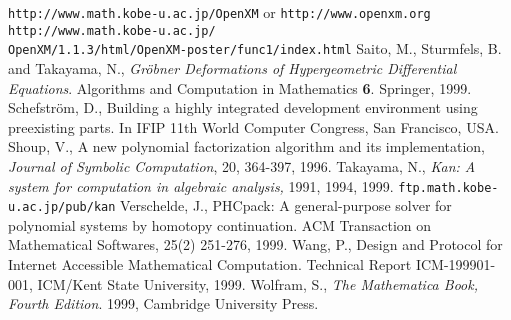 \begin{thebibliography}{X}
{\small {\tt http://www.math.kobe-u.ac.jp/OpenXM}}
or 
{\small {\tt http://www.openxm.org}}
{\small {\tt http://www.math.kobe-u.ac.jp/ \\ OpenXM/1.1.3/html/OpenXM-poster/func1/index.html}}
Saito, M., Sturmfels, B. and Takayama, N.,
{\it Gr\"obner Deformations of Hypergeometric Differential Equations}.
Algorithms and Computation in Mathematics {\bf 6}. Springer, 1999.
Schefstr\"om, D.,
Building a highly integrated development environment using
preexisting parts.
In IFIP 11th World Computer Congress, San Francisco, USA.
Shoup, V., 
A new polynomial factorization algorithm and 
its implementation,
{\sl Journal of Symbolic Computation}, 20, 364-397, 1996.
	Takayama, N.,
	{\em Kan: A system for computation in
	algebraic analysis,} 1991, 1994, 1999.
	{\small {\tt ftp.math.kobe-u.ac.jp/pub/kan}}
Verschelde, J.,
PHCpack: A general-purpose solver for polynomial systems by
homotopy continuation.  ACM Transaction on Mathematical Softwares, 25(2) 
251-276, 1999.
Wang, P.,
Design and Protocol for Internet Accessible Mathematical Computation.
Technical Report ICM-199901-001, ICM/Kent State University, 1999.
Wolfram, S.,
{\it The Mathematica Book, Fourth Edition}.
1999, Cambridge University Press.
\end{thebibliography}
